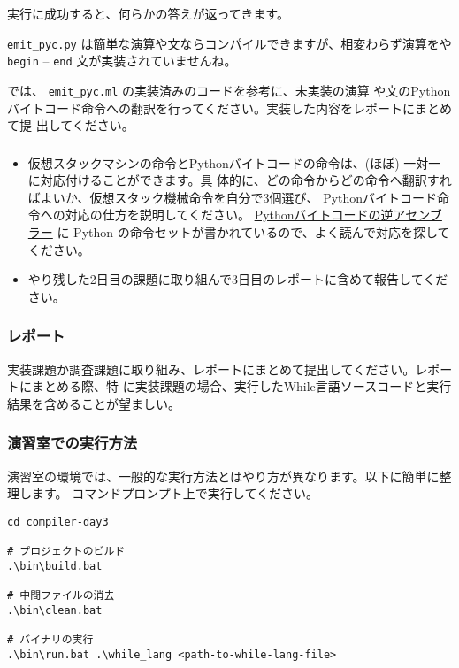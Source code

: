 \documentclass[a4paper,11pt]{jsarticle}
\begin{document}
実行に成功すると、何らかの答えが返ってきます。

\verb|emit_pyc.py| は簡単な演算や文ならコンパイルできますが、相変わらず演算をや \verb|begin| --
\verb|end| 文が実装されていませんね。

では、 \verb|emit_pyc.ml| の実装済みのコードを参考に、未実装の演算
や文のPythonバイトコード命令への翻訳を行ってください。実装した内容をレポートにまとめて提
出してください。

\subsubsection{}

\begin{itemize}
\item 仮想スタックマシンの命令とPythonバイトコードの命令は、(ほぼ) 一対一に対応付けることができます。具
  体的に、どの命令からどの命令へ翻訳すればよいか、仮想スタック機械命令を自分で3個選び、
  Pythonバイトコード命令への対応の仕方を説明してください。
  \href{https://docs.python.org/ja/3/library/dis.html}{Pythonバイトコードの逆アセンブラー}
  に Python の命令セットが書かれているので、よく読んで対応を探してください。
\item やり残した2日目の課題に取り組んで3日目のレポートに含めて報告してください。
\end{itemize}

\subsubsection{レポート}

実装課題か調査課題に取り組み、レポートにまとめて提出してください。レポートにまとめる際、特
に実装課題の場合、実行したWhile言語ソースコードと実行結果を含めることが望ましい。

\subsubsection{演習室での実行方法}

演習室の環境では、一般的な実行方法とはやり方が異なります。以下に簡単に整理します。
コマンドプロンプト上で実行してください。

\begin{lstlisting}
cd compiler-day3

# プロジェクトのビルド
.\bin\build.bat

# 中間ファイルの消去
.\bin\clean.bat

# バイナリの実行
.\bin\run.bat .\while_lang <path-to-while-lang-file>
\end{lstlisting}
\end{document}
